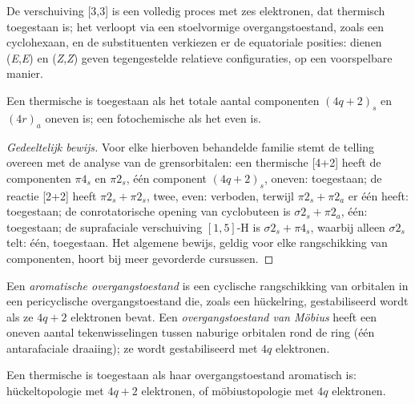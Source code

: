 De verschuiving [3,3] is een volledig  proces met zes
elektronen, dat thermisch toegestaan is;
het verloopt via een stoelvormige overgangstoestand, zoals een
cyclohexaan, en de substituenten verkiezen er de equatoriale posities: dienen (\textit{E},\textit{E}) en (\textit{Z},\textit{Z}) geven
tegengestelde relatieve configuraties, op een voorspelbare manier.

\begin{theorem}\label{thm:b3:pericyclic:woodward-hoffmann}
Een thermische  is toegestaan als het totale aantal componenten $(4q + 2)_s$ en
$(4r)_a$ oneven is; een fotochemische als het even is.
\end{theorem}

\begin{proof}[Gedeeltelijk bewijs]
Voor elke hierboven behandelde familie stemt de telling overeen met de
analyse van de grensorbitalen: een thermische  [4+2] heeft de componenten $\pi4_s$ en $\pi2_s$, één component $(4q + 2)_s$,
oneven: toegestaan; de reactie [2+2] heeft $\pi2_s + \pi2_s$, twee, even: verboden, terwijl
$\pi2_s + \pi2_a$ er één heeft: toegestaan; de conrotatorische opening van cyclobuteen is $\sigma2_s + \pi2_a$, één:
toegestaan; de suprafaciale verschuiving $[1,5]$-H is $\sigma2_s + \pi4_s$, waarbij alleen $\sigma2_s$ telt: één,
toegestaan. Het algemene bewijs, geldig voor elke rangschikking van
componenten, hoort bij meer gevorderde cursussen.
\end{proof}

\begin{definition}\label{def:b3:pericyclic:mobius}
Een \emph{aromatische overgangstoestand}
is een cyclische rangschikking van orbitalen in een pericyclische
overgangstoestand die, zoals een hückelring, gestabiliseerd wordt als ze
$4q + 2$ elektronen bevat. Een
\emph{overgangstoestand van Möbius}
heeft een oneven aantal tekenwisselingen tussen naburige orbitalen rond
de ring (één antarafaciale draaiing); ze wordt gestabiliseerd met $4q$ elektronen.
\end{definition}

\begin{proposition}\label{prop:b3:pericyclic:aromatic-ts}
Een thermische  is toegestaan als haar
overgangstoestand aromatisch is:
hückeltopologie met $4q + 2$ elektronen, of möbiustopologie met $4q$ elektronen.
\end{proposition}

